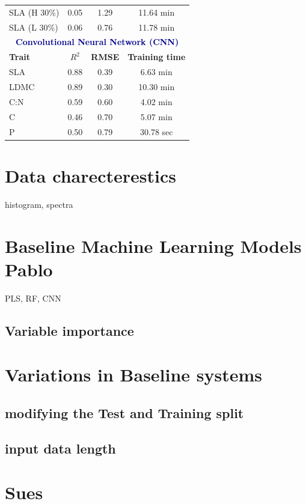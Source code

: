 \documentclass[12pt,a4paper]{report}
\begin{document}
\begin{table}[h!]
\begin{tabular}{lccc}
\midrule
SLA (H 30\%) & 0.05 & 1.29 &  11.64 min \\
SLA  (L 30\%)& 0.06 & 0.76 & 11.78 min \\
\midrule
\multicolumn{4}{c}{\textbf{\textcolor{darkblue}{Convolutional Neural Network (CNN)}}} \\
\midrule
\textbf{Trait} & \textbf{$R^2$} & \textbf{RMSE} & \textbf{Training time} \\
\midrule
SLA  & 0.88 & 0.39 & 6.63 min \\
LDMC & 0.89 & 0.30 & 10.30 min \\
C:N  & 0.59 & 0.60 & 4.02 min \\
C    & 0.46 & 0.70 & 5.07 min \\
P    & 0.50 & 0.79 & 30.78 sec \\
\bottomrule
\end{tabular}
\end{table}





\section{Data charecterestics}
histogram, spectra
\section{Baseline Machine Learning Models Pablo}
PLS, RF, CNN

\subsection{Variable importance}

\section{ Variations in Baseline systems}
\subsection{ modifying the Test and Training split}
\subsection{ input data length}

\section{Sues}
\end{document}
